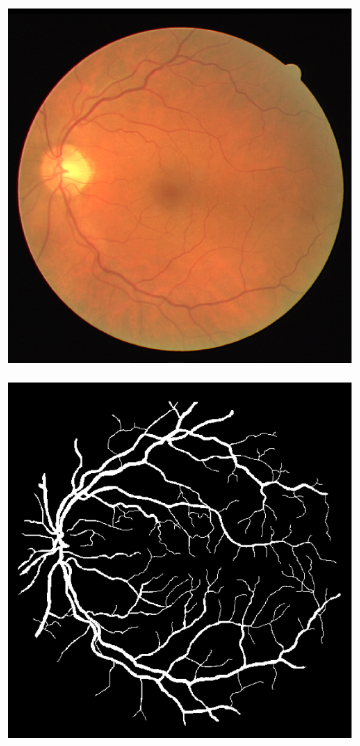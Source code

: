 \documentclass[aps,prb,10pt,twocolumn,groupedaddress]{revtex4-1}
\begin{document}
\begin{figure}[!t]
\begin{subfigure}[]{0.22\textwidth}
		\caption{}
	\end{subfigure}\\
	\vspace{0.25cm}
	\centering
	\begin{subfigure}[]{0.22\textwidth}
		\centering
		\includegraphics[width=\textwidth]{images/09_test.eps}
		\caption{}
	\end{subfigure}
	\hspace{0.25cm}
	\centering
	\begin{subfigure}[]{0.22\textwidth}
		\centering
		\includegraphics[width=\textwidth]{images/09_manual1.eps}

\end{subfigure}
\end{figure}
\end{document}
